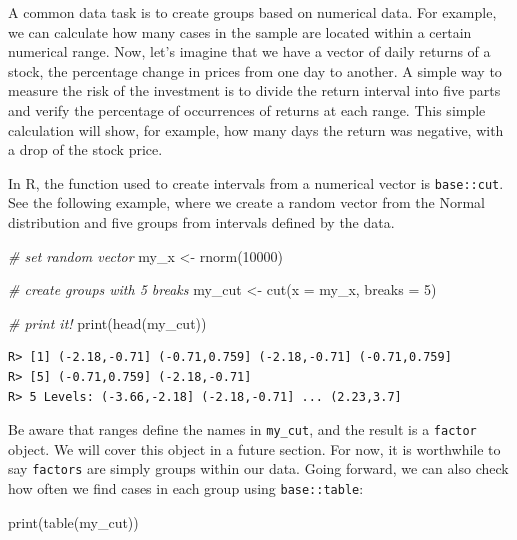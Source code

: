 \documentclass[
  12pt,
]{book}
\newenvironment{Shaded}{\begin{snugshade}}{\end{snugshade}}
\newcommand{\AttributeTok}[1]{\textcolor[rgb]{0.61,0.61,0.61}{#1}}
\newcommand{\CommentTok}[1]{\textcolor[rgb]{0.37,0.37,0.37}{\textit{#1}}}
\newcommand{\DecValTok}[1]{\textcolor[rgb]{0.06,0.06,0.06}{#1}}
\newcommand{\FunctionTok}[1]{\textcolor[rgb]{0,0,0}{#1}}
\newcommand{\NormalTok}[1]{#1}
\newcommand{\OtherTok}[1]{\textcolor[rgb]{0.37,0.37,0.37}{#1}}
\begin{document}
A common data task is to create groups based on numerical data. For example, we can calculate how many cases in the sample are located within a certain numerical range. Now, let's imagine that we have a vector of daily returns of a stock, the percentage change in prices from one day to another. A simple way to measure the risk of the investment is to divide the return interval into five parts and verify the percentage of occurrences of returns at each range. This simple calculation will show, for example, how many days the return was negative, with a drop of the stock price.

In R, the function used to create intervals from a numerical vector is \texttt{base::cut}. See the following example, where we create a random vector from the Normal distribution and five groups from intervals defined by the data. 

\begin{Shaded}
\begin{Highlighting}[]
\CommentTok{\# set random vector}
\NormalTok{my\_x }\OtherTok{\textless{}{-}} \FunctionTok{rnorm}\NormalTok{(}\DecValTok{10000}\NormalTok{)}

\CommentTok{\# create groups with 5 breaks}
\NormalTok{my\_cut }\OtherTok{\textless{}{-}} \FunctionTok{cut}\NormalTok{(}\AttributeTok{x =}\NormalTok{ my\_x, }\AttributeTok{breaks =} \DecValTok{5}\NormalTok{)}

\CommentTok{\# print it!}
\FunctionTok{print}\NormalTok{(}\FunctionTok{head}\NormalTok{(my\_cut))}
\end{Highlighting}
\end{Shaded}

\begin{verbatim}
R> [1] (-2.18,-0.71] (-0.71,0.759] (-2.18,-0.71] (-0.71,0.759]
R> [5] (-0.71,0.759] (-2.18,-0.71]
R> 5 Levels: (-3.66,-2.18] (-2.18,-0.71] ... (2.23,3.7]
\end{verbatim}

Be aware that ranges define the names in \texttt{my\_cut}, and the result is a \texttt{factor} object. We will cover this object in a future section. For now, it is worthwhile to say \texttt{factors} are simply groups within our data. Going forward, we can also check how often we find cases in each group using \texttt{base::table}:

\begin{Shaded}
\begin{Highlighting}[]
\FunctionTok{print}\NormalTok{(}\FunctionTok{table}\NormalTok{(my\_cut))}
\end{Highlighting}
\end{Shaded}
\end{document}
